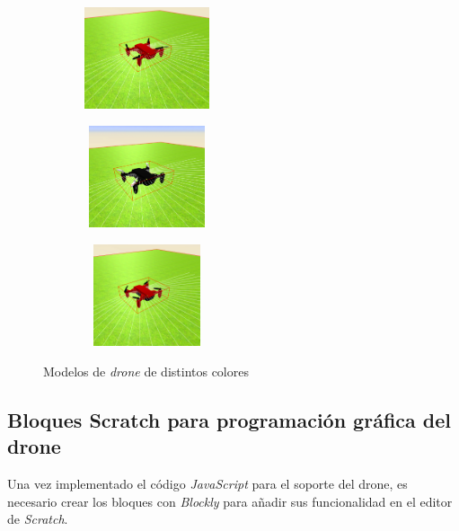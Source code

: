       \begin{figure}[H]
        \centering
        \begin{subfigure}{0.3\textwidth}
         \includegraphics[width=4cm, height=3cm]{img/red_drone.png}
 \label{fig:drone_rojo}
        \end{subfigure}
        \begin{subfigure}{0.3\textwidth}
         \includegraphics[width=4cm, height=3cm]{img/black_drone.png}
   \label{fig:drone_negro}
        \end{subfigure}
        \begin{subfigure}{0.3\textwidth}
         \includegraphics[width=4cm, height=3cm]{img/red_blackdrone.png}
   \label{fig:drone_negrorojo}
        \end{subfigure}
          \caption{Modelos de \textit{drone} de distintos colores}
    \end{figure}

\subsection{Bloques Scratch para programación gráfica del drone}
\label{subsec:bloques}
Una vez implementado el código \textit{JavaScript} para el soporte del drone, es necesario crear los bloques con \textit{Blockly} para añadir sus funcionalidad en el editor de \textit{Scratch}. 

